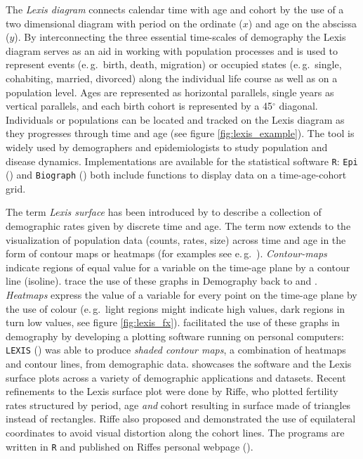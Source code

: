\documentclass[a4paper]{scrartcl}
\begin{document}
The \emph{Lexis diagram} connects calendar time with age and cohort by the use of a two dimensional diagram with period on the ordinate ($x$) and age on the abscissa ($y$). By interconnecting the three essential time-scales of demography the Lexis diagram serves as an aid in working with population processes and is used to represent events (e.\,g.~birth, death, migration) or occupied states (e.\,g.~single, cohabiting, married, divorced) along the individual life course as well as on a population level. Ages are represented as horizontal parallels, single years as vertical parallels, and each birth cohort is represented by a 45$^\circ$ diagonal. Individuals or populations can be located and tracked on the Lexis diagram as they progresses through time and age (see figure \ref{fig:lexis_example}). The tool is widely used by demographers and epidemiologists to study population and disease dynamics. Implementations are available for the statistical software \texttt{R}: \texttt{Epi} (\cite{Carstensen2014}) and \texttt{Biograph} (\cite{Willekens2013b}) both include functions to display data on a time-age-cohort grid.

The term \emph{Lexis surface} has been introduced by \cite{Arthur1984} to describe a collection of demographic rates given by discrete time and age. The term now extends to the visualization of population data (counts, rates, size) across time and age in the form of contour maps or heatmaps (for examples see e.\,g.~\cite{Rau2008, Scherbov2002}). \emph{Contour-maps} indicate regions of equal value for a variable on the time-age plane by a contour line (isoline). \textcite{Vaupel1987} trace the use of these graphs in Demography back to \textcite{Kermack1934} and \textcite{Delaporte1941}. \emph{Heatmaps} express the value of a variable for every point on the time-age plane by the use of colour (e.\,g.~light regions might indicate high values, dark regions in turn low values, see figure \ref{fig:lexis_fx}). \citeauthor{Gambill1985} facilitated the use of these graphs in demography by developing a plotting software running on personal computers: \texttt{LEXIS} (\cite{Gambill1985}) was able to produce \emph{shaded contour maps}, a combination of heatmaps and contour lines, from demographic data.  showcases the software and the Lexis surface plots across a variety of demographic applications and datasets. Recent refinements to the Lexis surface plot were done by Riffe, who plotted fertility rates structured by period, age \emph{and} cohort resulting in surface made of triangles instead of rectangles. Riffe also proposed and demonstrated the use of equilateral coordinates to avoid visual distortion along the cohort lines. The programs are written in \texttt{R} and published on Riffes personal webpage (\cite{Riffe2014}).
\end{document}
